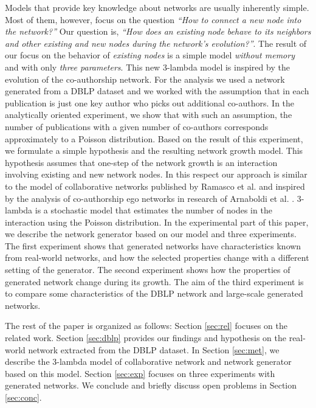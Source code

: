\documentclass{sig-alternate-05-2015}
\begin{document}
Models that provide key knowledge about networks are usually inherently simple. Most of them, however, focus on the question \textit{``How to connect a new node into the network?''} Our question is, \textit{``How does an existing node behave to its neighbors and other existing and new nodes during the network's evolution?''}. The result of our focus on the behavior of \textit{existing nodes} is a simple model \textit{without memory} and with only \textit{three parameters}. This new 3-lambda model is inspired by the evolution of the co-authorship network. For the analysis we used a network generated from a DBLP dataset and we worked with the assumption that in each publication is just one key author who picks out additional co-authors. In the analytically oriented experiment, we show that with such an assumption, the number of publications with a given number of co-authors corresponds approximately to a Poisson distribution. Based on the result of this experiment, we formulate a simple hypothesis and the resulting network growth model. This hypothesis assumes that one-step of the network growth is an interaction involving existing and new network nodes. In this respect our approach is similar to the model of collaborative networks published by Ramasco et al. \cite{ramasco2004self} and inspired by the analysis of co-authorship ego networks in research of Arnaboldi et al. \cite{Arnaboldi2016analysis}. 3-lambda is a stochastic model that estimates the number of nodes in the interaction using the Poisson distribution. In the experimental part of this paper, we describe the network generator based on our model and three experiments. The first experiment shows that generated networks have characteristics known from real-world networks, and how the selected properties change with a different setting of the generator. The second experiment shows how the properties of generated network change during its growth. The aim of the third experiment is to compare some characteristics of the DBLP network and large-scale generated networks.

The rest of the paper is organized as follows: Section \ref{sec:rel} focuses on the related work. Section \ref{sec:dblp} provides our findings and hypothesis on the real-world network extracted from the DBLP dataset. In Section \ref{sec:met}, we describe the 3-lambda model of collaborative network and network generator based on this model. Section \ref{sec:exp} focuses on three experiments with generated networks. We conclude and briefly discuss open problems in Section \ref{sec:conc}.
\end{document}
